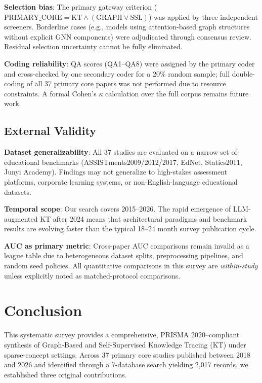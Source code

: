 \documentclass[journal]{IEEEtran}
\begin{document}
\textbf{Selection bias}: The primary gateway criterion ($\text{PRIMARY\_CORE} = \text{KT} \land (\text{GRAPH} \lor \text{SSL})$) was applied by three independent screeners. Borderline cases (e.g., models using attention-based graph structures without explicit GNN components) were adjudicated through consensus review. Residual selection uncertainty cannot be fully eliminated.

\textbf{Coding reliability}: QA scores (QA1--QA8) were assigned by the primary coder and cross-checked by one secondary coder for a 20\% random sample; full double-coding of all 37 primary core papers was not performed due to resource constraints. A formal Cohen's $\kappa$ calculation over the full corpus remains future work.

\subsection{External Validity}
\textbf{Dataset generalizability}: All 37 studies are evaluated on a narrow set of educational benchmarks (ASSISTments2009/2012/2017, EdNet, Statics2011, Junyi Academy). Findings may not generalize to high-stakes assessment platforms, corporate learning systems, or non-English-language educational datasets.

\textbf{Temporal scope}: Our search covers 2015--2026. The rapid emergence of LLM-augmented KT after 2024 means that architectural paradigms and benchmark results are evolving faster than the typical 18--24 month survey publication cycle.

\textbf{AUC as primary metric}: Cross-paper AUC comparisons remain invalid as a league table due to heterogeneous dataset splits, preprocessing pipelines, and random seed policies. All quantitative comparisons in this survey are \textit{within-study} unless explicitly noted as matched-protocol comparisons.

\section{Conclusion}
\label{sec:conclusion}

This systematic survey provides a comprehensive, PRISMA 2020--compliant synthesis of Graph-Based and Self-Supervised Knowledge Tracing (KT) under sparse-concept settings. Across 37 primary core studies published between 2018 and 2026 and identified through a 7-database search yielding 2,017 records, we established three original contributions.
\end{document}
